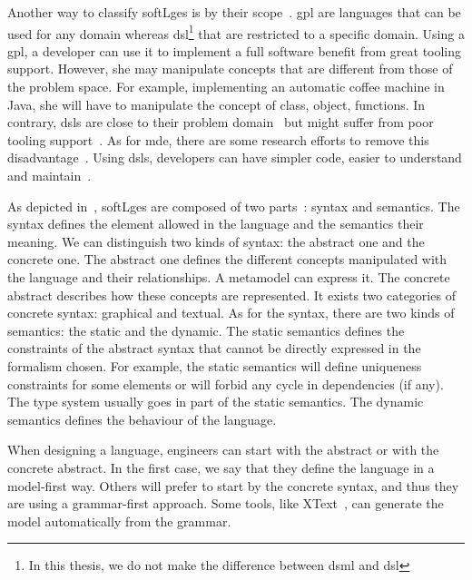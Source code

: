 Another way to classify \glspl{softLge} is by their scope~\cite{DBLP:journals/sigplan/DeursenKV00}.
\Gls{gpl} are languages that can be used for any domain whereas \gls{dsl}\footnote{In this thesis, we do not make the difference between \gls{dsml} and \gls{dsl}} that are restricted to a specific domain.
Using a \gls{gpl}, a developer can use it to implement a full software benefit from great tooling support. 
However, she may manipulate concepts that are different from those of the problem space.
For example, implementing an automatic coffee machine in Java, she will have to manipulate the concept of class, object, functions.
In contrary, \glspl{dsl} are close to their problem domain~\cite{DBLP:journals/smr/DeursenK98} but might suffer from poor tooling support~\cite{voelter2014generic}.
As for \gls{mde}, there are some research efforts to remove this disadvantage~\cite{DBLP:journals/jss/BousseLCWB18}. 
Using \glspl{dsl}, developers can have simpler code, easier to understand and maintain~\cite{DBLP:journals/sigplan/DeursenKV00, DBLP:journals/smr/DeursenK98}.

As depicted in~, \Glspl{softLge} are composed of two parts~\cite{DBLP:journals/computer/HarelR04}: syntax and semantics.
The syntax defines the element allowed in the language and the semantics their meaning.
We can distinguish two kinds of syntax: the abstract one and the concrete one.
The abstract one defines the different concepts manipulated with the language and their relationships.
A \gls{metamodel} can express it.
The concrete abstract describes how these concepts are represented.
It exists two categories of concrete syntax: graphical and textual.
As for the syntax, there are two kinds of semantics: the static and the dynamic.
The static semantics defines the constraints of the abstract syntax that cannot be directly expressed in the formalism chosen.
For example, the static semantics will define uniqueness constraints for some elements or will forbid any cycle in dependencies (if any).
The type system usually goes in part of the static semantics.
The dynamic semantics defines the behaviour of the language.

When designing a language, engineers can start with the abstract or with the concrete abstract.
In the first case, we say that they define the language in a \gls{model}-first way.
Others will prefer to start by the concrete syntax, and thus they are using a grammar-first approach.
Some tools, like XText~\cite{DBLP:conf/oopsla/EysholdtB10}, can generate the model automatically from the grammar.
 

